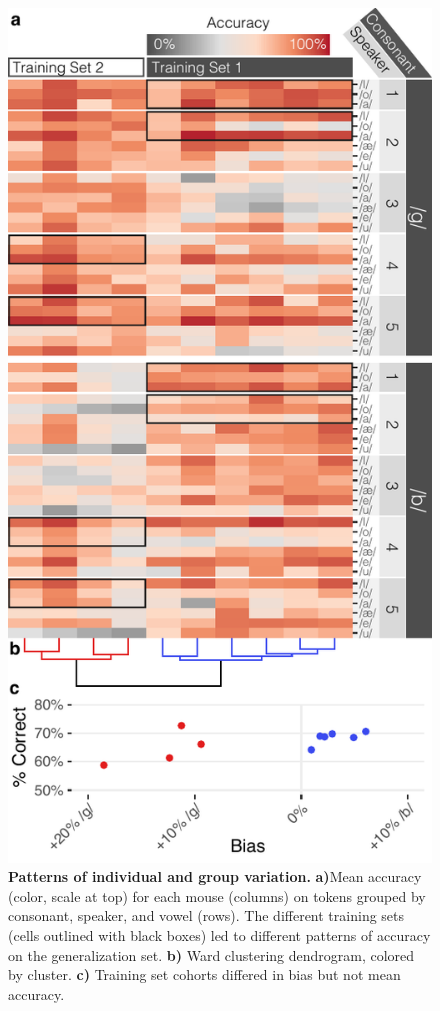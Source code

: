 \begin{figure}[ht]
\includegraphics[width=\linewidth]{speech/figures/Figure4.pdf}
\caption{\textbf{Patterns of individual and group variation.} \textbf{a)}Mean accuracy (color, scale at top) for each mouse (columns) on tokens grouped by consonant, speaker, and vowel (rows). The different training sets (cells outlined with black boxes) led to different patterns of accuracy on the generalization set. \textbf{b)} Ward clustering dendrogram, colored by cluster. \textbf{c)} Training set cohorts differed in bias but not mean accuracy.
}
\label{heat}
\end{figure}

